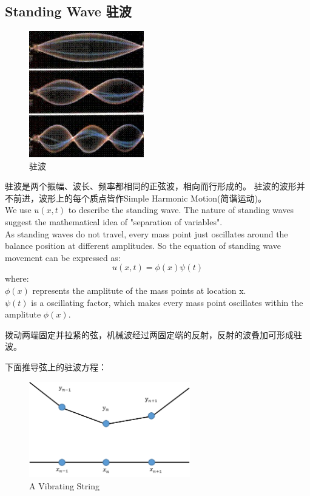 \documentclass[UTF8,10pt,a4paper]{ctexart}
\begin{document}
	\subsection{Standing Wave 驻波}
		\begin{figure}[ht]
			\centering
			\includegraphics[width=5cm]{standingwave.png}
			\caption{驻波}
			\label{fig:standingWave}
		\end{figure}
		\noindent
		驻波是两个振幅、波长、频率都相同的正弦波，相向而行形成的。
		驻波的波形并不前进，波形上的每个质点皆作Simple Harmonic Motion(简谐运动)。\\
		We use $u(x,t)$ to describe the standing wave. The nature of standing waves suggest 
		the mathematical idea of "separation of variables".\\
		\noindent
		As standing waves do not travel, every mass point just oscillates around the balance position 
		at different amplitudes. So the equation of standing wave movement can be expressed as:
		\begin{equation}
		u(x,t)=\phi (x) \psi(t)
		\end{equation}
		where:\\
		 	$\phi(x)$ represents the amplitute of the mass points at location x. \\
		 	$\psi(t)$ is a oscillating factor, which makes every mass point 
			oscillates within the amplitute $\phi(x)$.
			  
		拨动两端固定并拉紧的弦，机械波经过两固定端的反射，反射的波叠加可形成驻波。
		  
		下面推导弦上的驻波方程：
		\begin{figure}
			\centering
			\includegraphics[width=7cm]{vibratingString.png}
			\caption{A Vibrating String}
			\label{fig:vibStr}
		\end{figure}		
  		
\end{document}
